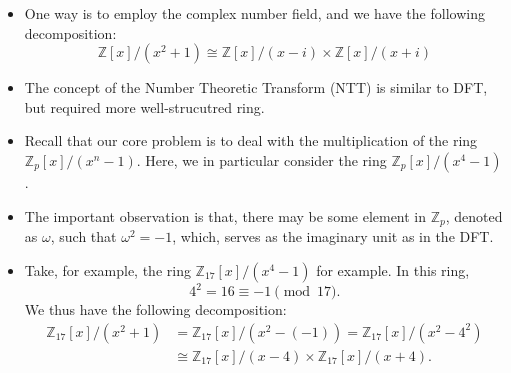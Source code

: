 \begin{frame}
    \begin{itemize}
        \item One way is to employ the complex number field, 
            and we have the following decomposition:
            \[ \mathbb{Z}[x]/(x^2 + 1) \cong 
            \mathbb{Z}[x]/(x - i) \times 
            \mathbb{Z}[x]/(x + i) \]
        \item The concept of the Number Theoretic Transform (NTT) is similar to DFT, 
            but required more well-strucutred ring.
        \item Recall that our core problem is to deal with the multiplication of
            the ring \( \mathbb{Z}_{p}[x]/(x^{n}-1) \).
            Here, we in particular consider the ring \( \mathbb{Z}_{p}[x]/(x^{4}-1) \).
        \item The important observation is that, there may be some element in \( \mathbb{Z}_{p}\),
            denoted as \(\omega\), such that \(\omega^{2} = -1\), which, serves as the imaginary unit
            as in the DFT.

        \item Take, for example, the ring \( \mathbb{Z}_{17}[x]/(x^{4}-1)\) for example. 
            In this ring,
            \[
                4^{2} = 16 \equiv -1 \pmod{17}.
            \]
            We thus have the following decomposition:
            \begin{align*}
                \mathbb{Z}_{17}[x]/(x^{2}+1) 
                &= \mathbb{Z}_{17}[x] / (x^{2} - (-1))
                = \mathbb{Z}_{17}[x] / (x^{2} - 4^{2})\\
                &\cong 
                \mathbb{Z}_{17}[x]/(x-4) \times 
                \mathbb{Z}_{17}[x]/(x+4).
            \end{align*}

    \end{itemize}
\end{frame}




